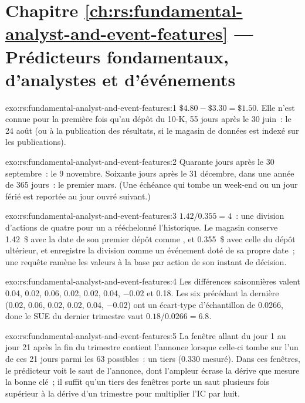 \section*{Chapitre \ref{ch:rs:fundamental-analyst-and-event-features} --- Prédicteurs fondamentaux, d'analystes et d'événements}

\begin{solution}{exo:rs:fundamental-analyst-and-event-features:1}
$\$4.80 - \$3.30 = \$1.50$. Elle n'est connue pour la première fois qu'au dépôt du 10-K, 55 jours après le 30 juin~: le 24 août (ou à la publication des résultats, si
le magasin de données est indexé sur les publications).
\end{solution}

\begin{solution}{exo:rs:fundamental-analyst-and-event-features:2}
Quarante jours après le 30 septembre~: le 9 novembre. Soixante jours après le 31 décembre, dans une année de 365 jours~: le premier mars. (Une échéance qui tombe un week-end
ou un jour férié est reportée au jour ouvré suivant.)
\end{solution}

\begin{solution}{exo:rs:fundamental-analyst-and-event-features:3}
$1.42/0.355 = 4$~: une division d'actions de quatre pour un a rééchelonné l'historique. Le magasin conserve 1.42~\$ avec la date de son premier dépôt comme , et 0.355~\$
avec celle du dépôt ultérieur, et enregistre la division comme un événement doté de sa propre date~; une requête ramène les valeurs à la base par action de son instant de décision.
\end{solution}

\begin{solution}{exo:rs:fundamental-analyst-and-event-features:4}
Les différences saisonnières valent 0.04, 0.02, 0.06, 0.02, 0.02, 0.04, $-0.02$ et 0.18. Les six précédant la dernière (0.02, 0.06, 0.02, 0.02, 0.04,
$-0.02$) ont un écart-type d'échantillon de 0.0266, donc le SUE du dernier trimestre vaut $0.18/0.0266 = 6.8$.
\end{solution}

\begin{solution}{exo:rs:fundamental-analyst-and-event-features:5}
La fenêtre allant du jour 1 au jour 21 après la fin du trimestre contient l'annonce lorsque celle-ci tombe sur l'un de ces 21 jours parmi les 63 possibles~: un
tiers (0.330 mesuré). Dans ces fenêtres, le prédicteur voit le saut de l'annonce, dont l'ampleur écrase la dérive que mesure la bonne clé~; il
suffit qu'un tiers des fenêtres porte un saut plusieurs fois supérieur à la dérive d'un trimestre pour multiplier l'IC par huit.
\end{solution}

